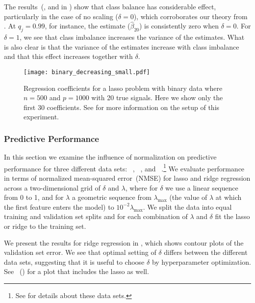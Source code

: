 The results~(, and  in
) show that class balance has considerable effect,
particularly in the case of no scaling (\(\delta = 0\)), which corroborates our theory from
. At \(q_j=0.99\), for instance, the estimate
(\(\hat{\beta}_{20}\)) is consistently zero when \(\delta = 0\). For \(\delta=1\), we see
that class imbalance increases the variance of the estimates. What is also clear is that
the variance of the estimates increase with class imbalance and that this effect increases
together with \(\delta\).

\begin{figure}[htpb]
  \centering
  \texttt{[image: binary\_decreasing\_small.pdf]}
  \caption{%
    Regression coefficients for a lasso problem with binary data where \(n = 500\) and
    \(p = \num{1000}\) with 20 true signals. Here we show only the first 30
    coefficients. See  for more information
    on the setup of this experiment.
  }
  \label{fig:binary-decreasing}
\end{figure}

\subsubsection{Predictive Performance}

In this section we examine the influence of normalization on predictive performance for
three different data sets: ~\citep{becker1996}, ~\citep{rhee2006},
and ~\citep{platt1998}.\footnote{See  for details about
  these data sets.} We evaluate performance in terms of normalized mean-squared error~(NMSE)
for lasso and ridge regression across a two-dimensional grid of \(\delta\) and \(\lambda\),
where for \(\delta\) we use a linear sequence from 0 to 1, and for \(\lambda\) a geometric
sequence from \(\lambda_\text{max}\) (the value of \(\lambda\) at which the first feature
enters the model) to \(10^{-2}\lambda_\text{max}\). We split the data into equal training
and validation set splits and for each combination of \(\lambda\) and \(\delta\) fit the
lasso or ridge to the training set.

We present the results for ridge regression in , which shows
contour plots of the validation set error. We see that optimal setting of \(\delta\)
differs between the different data sets, suggesting that it is useful to choose \(\delta\)
by hyperparameter optimization. See
~() for a plot
that includes the lasso as well.

